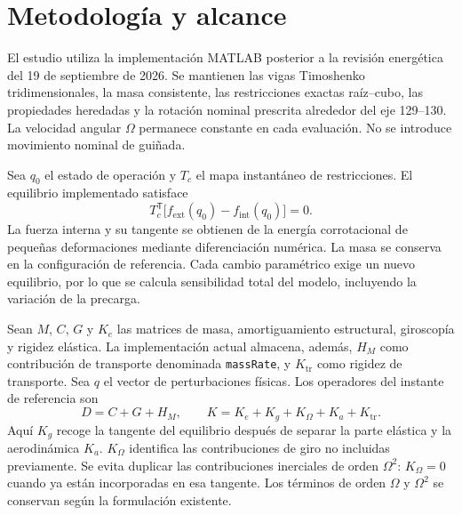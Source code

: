 

\section{Metodología y alcance}
El estudio utiliza la implementación MATLAB posterior a la revisión energética del 19 de septiembre de 2026. Se mantienen las vigas Timoshenko tridimensionales, la masa consistente, las restricciones exactas raíz--cubo, las propiedades heredadas y la rotación nominal prescrita alrededor del eje 129--130. La velocidad angular $\Omega$ permanece constante en cada evaluación. No se introduce movimiento nominal de guiñada.

Sea $q_0$ el estado de operación y $T_c$ el mapa instantáneo de restricciones. El equilibrio implementado satisface
\begin{equation}
T_c^{\mathsf T}\bigl[f_{\mathrm{ext}}(q_0)-f_{\mathrm{int}}(q_0)\bigr]=0.
\end{equation}
La fuerza interna y su tangente se obtienen de la energía corrotacional de pequeñas deformaciones mediante diferenciación numérica. La masa se conserva en la configuración de referencia. Cada cambio paramétrico exige un nuevo equilibrio, por lo que se calcula sensibilidad total del modelo, incluyendo la variación de la precarga.

Sean $M$, $C$, $G$ y $K_e$ las matrices de masa, amortiguamiento estructural, giroscopía y rigidez elástica. La implementación actual almacena, además, $H_M$ como contribución de transporte denominada \texttt{massRate}, y $K_{\mathrm{tr}}$ como rigidez de transporte. Sea $q$ el vector de perturbaciones físicas. Los operadores del instante de referencia son
\begin{equation}
D=C+G+H_M,\qquad
K=K_e+K_g+K_\Omega+K_a+K_{\mathrm{tr}}.
\end{equation}
Aquí $K_g$ recoge la tangente del equilibrio después de separar la parte elástica y la aerodinámica $K_a$. $K_\Omega$ identifica las contribuciones de giro no incluidas previamente. Se evita duplicar las contribuciones inerciales de orden $\Omega^2$: $K_\Omega=0$ cuando ya están incorporadas en esa tangente. Los términos de orden $\Omega$ y $\Omega^2$ se conservan según la formulación existente.

